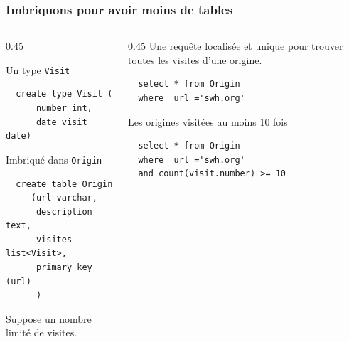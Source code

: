 	
\begin{frame}[fragile] \frametitle{Imbriquons pour avoir moins de tables}

\vfill
\begin{columns}
    \begin{column}{0.45\textwidth}
    
    Un type \texttt{Visit}
    
  \begin{verbatim}
  create type Visit (
      number int,
      date_visit date)
  \end{verbatim}
    
    \vfill
    Imbriqué dans \texttt{Origin}
    \vfill
  \begin{verbatim}
  create table Origin 
     (url varchar, 
      description text,
      visites list<Visit>,
      primary key (url)
      )
  \end{verbatim}
  
  \vfill
  Suppose un nombre limité de visites.
   \end{column}
 \begin{column}{0.45\textwidth}
  Une requête localisée et unique pour trouver toutes les visites d'une origine.

  \begin{verbatim}
  select * from Origin 
  where  url ='swh.org'
  \end{verbatim}
  
  \vfill
  Les origines visitées au moins 10 fois
  
   \begin{verbatim}
  select * from Origin 
  where  url ='swh.org'
  and count(visit.number) >= 10
  \end{verbatim}
  
\end{column}
\end{columns}
	
\end{frame}


